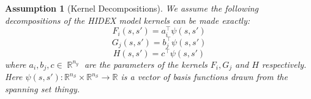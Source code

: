 \documentclass{IEEEtran}
\DeclareMathOperator{\R}{\mathbb{R}}
\DeclareMathOperator{\onto}{\rightarrow}
\newtheorem{assumption}{Assumption}
\begin{document}
\begin{assumption}[Kernel Decompositions]
	\label{ass:kerndecomp}
	We assume the following decompositions of the HIDEX model kernels can be made exactly:
	\begin{equation}
	F_i(s,s') = a_i^\top\psi(s,s')
\end{equation}
\begin{equation}
	G_j(s,s') = b_j^\top\psi(s,s')
\end{equation}
\begin{equation}
	H(s,s') = c^\top\psi(s,s')
\end{equation}
where $a_i, b_j, c \in \R^{n_y}$ are the parameters of the kernels $F_i, G_j$ and $H$ respectively. Here $\psi(s,s') : \mathbb{R}^{n_\mathcal{S}} \times \mathbb{R}^{n_\mathcal{S}} \onto \mathbb{R}$ is a vector of basis functions drawn from the spanning set thingy.
\end{assumption}
\end{document}

